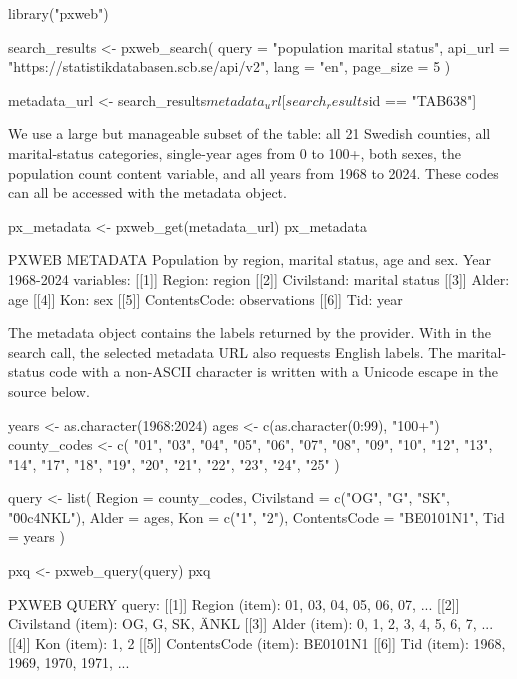 \begin{example}
library("pxweb")

search_results <- pxweb_search(
  query = "population marital status",
  api_url = "https://statistikdatabasen.scb.se/api/v2",
  lang = "en",
  page_size = 5
)

metadata_url <- search_results$metadata_url[search_results$id == "TAB638"]
\end{example}

We use a large but manageable subset of the table: all 21 Swedish counties, all marital-status categories, single-year ages from 0 to 100+, both sexes, the population count content variable, and all years from 1968 to 2024.
These codes can all be accessed with the metadata object.

\begin{example}
px_metadata <- pxweb_get(metadata_url)
px_metadata
\end{example}

\begin{example}
PXWEB METADATA
Population by region, marital status, age and sex.  Year 1968-2024
variables:
 [[1]] Region: region
 [[2]] Civilstand: marital status
 [[3]] Alder: age
 [[4]] Kon: sex
 [[5]] ContentsCode: observations
 [[6]] Tid: year
\end{example}

The metadata object contains the labels returned by the provider.
With  in the search call, the selected metadata URL also requests English labels.
The marital-status code with a non-ASCII character is written with a Unicode escape in the source below.

\begin{example}
years <- as.character(1968:2024)
ages <- c(as.character(0:99), "100+")
county_codes <- c(
  "01", "03", "04", "05", "06", "07", "08", "09", "10", "12", "13",
  "14", "17", "18", "19", "20", "21", "22", "23", "24", "25"
)

query <- list(
  Region = county_codes,
  Civilstand = c("OG", "G", "SK", "\u00c4NKL"),
  Alder = ages,
  Kon = c("1", "2"),
  ContentsCode = "BE0101N1",
  Tid = years
)

pxq <- pxweb_query(query)
pxq

PXWEB QUERY
query:
 [[1]] Region (item):
   01, 03, 04, 05, 06, 07, ...
 [[2]] Civilstand (item):
   OG, G, SK, ÄNKL
 [[3]] Alder (item):
   0, 1, 2, 3, 4, 5, 6, 7, ...
 [[4]] Kon (item):
   1, 2
 [[5]] ContentsCode (item):
   BE0101N1
 [[6]] Tid (item):
   1968, 1969, 1970, 1971, ...
\end{example}

